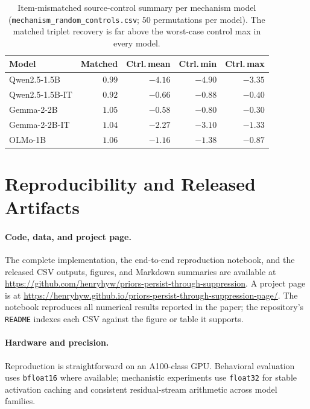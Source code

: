 \documentclass[11pt]{article}
\begin{document}
\begin{table}[H]
\centering
\scriptsize
\setlength{\tabcolsep}{2pt}
\begin{tabular*}{\columnwidth}{@{\extracolsep{\fill}}lrrrr@{}}
\toprule
Model & Matched & Ctrl.\,mean & Ctrl.\,min & Ctrl.\,max \\
\midrule
Qwen2.5-1.5B    & $0.99$ & $-4.16$ & $-4.90$ & $-3.35$ \\
Qwen2.5-1.5B-IT & $0.92$ & $-0.66$ & $-0.88$ & $-0.40$ \\
Gemma-2-2B      & $1.05$ & $-0.58$ & $-0.80$ & $-0.30$ \\
Gemma-2-2B-IT   & $1.04$ & $-2.27$ & $-3.10$ & $-1.33$ \\
OLMo-1B         & $1.06$ & $-1.16$ & $-1.38$ & $-0.87$ \\
\bottomrule
\end{tabular*}
\caption{Item-mismatched source-control summary per mechanism model
(\texttt{mechanism\_random\_controls.csv}; $50$ permutations per model). The matched triplet
recovery is far above the worst-case control max in every model.}
\label{tab:random_summary}
\end{table}

\FloatBarrier
\section{Reproducibility and Released Artifacts}
\label{app:reproducibility}

\paragraph{Code, data, and project page.}
The complete implementation, the end-to-end reproduction notebook, and the released CSV
outputs, figures, and Markdown summaries are available at
\url{https://github.com/henryhyw/priors-persist-through-suppression}.
A project page is at
\url{https://henryhyw.github.io/priors-persist-through-suppression-page/}.
The notebook reproduces all numerical results reported in the paper; the repository's
\texttt{README} indexes each CSV against the figure or table it supports.

\paragraph{Hardware and precision.}
Reproduction is straightforward on an A100-class GPU. Behavioral evaluation uses
\texttt{bfloat16} where available; mechanistic experiments use \texttt{float32} for stable
activation caching and consistent residual-stream arithmetic across model families.
\end{document}
